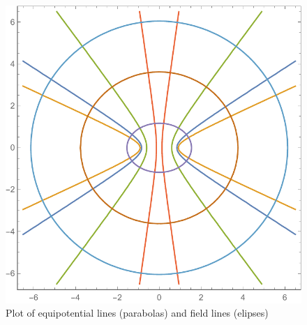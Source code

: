 \documentclass[a4paper,12pt]{article}
\begin{document}
\begin{figure}[H]
	\centering
	\includegraphics[width=0.7\linewidth]{contour.pdf}
	\caption{Plot of equipotential lines (parabolas) and field lines (elipses)}
	\label{fig:4}
\end{figure}
\end{document}
